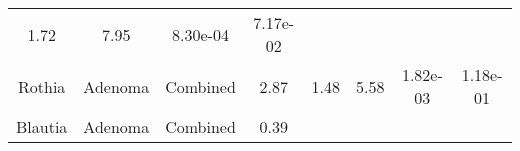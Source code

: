 \documentclass[12pt,]{article}
\begin{document}
\begin{longtable}[]{@{}cccccccc@{}}
\begin{minipage}[t]{0.13\columnwidth}
1.72\strut
\end{minipage} & \begin{minipage}[t]{0.13\columnwidth}\centering\strut
7.95\strut
\end{minipage} & \begin{minipage}[t]{0.07\columnwidth}\centering\strut
8.30e-04\strut
\end{minipage} & \begin{minipage}[t]{0.07\columnwidth}\centering\strut
7.17e-02\strut
\end{minipage}\tabularnewline
\begin{minipage}[t]{0.16\columnwidth}\centering\strut
Rothia\strut
\end{minipage} & \begin{minipage}[t]{0.08\columnwidth}\centering\strut
Adenoma\strut
\end{minipage} & \begin{minipage}[t]{0.09\columnwidth}\centering\strut
Combined\strut
\end{minipage} & \begin{minipage}[t]{0.05\columnwidth}\centering\strut
2.87\strut
\end{minipage} & \begin{minipage}[t]{0.13\columnwidth}\centering\strut
1.48\strut
\end{minipage} & \begin{minipage}[t]{0.13\columnwidth}\centering\strut
5.58\strut
\end{minipage} & \begin{minipage}[t]{0.07\columnwidth}\centering\strut
1.82e-03\strut
\end{minipage} & \begin{minipage}[t]{0.07\columnwidth}\centering\strut
1.18e-01\strut
\end{minipage}\tabularnewline
\begin{minipage}[t]{0.16\columnwidth}\centering\strut
Blautia\strut
\end{minipage} & \begin{minipage}[t]{0.08\columnwidth}\centering\strut
Adenoma\strut
\end{minipage} & \begin{minipage}[t]{0.09\columnwidth}\centering\strut
Combined\strut
\end{minipage} & \begin{minipage}[t]{0.05\columnwidth}\centering\strut
0.39\strut
\end{minipage} & \begin{minipage}[t]{0.13\columnwidth}\centering\strut

\end{minipage}
\end{longtable}
\end{document}
